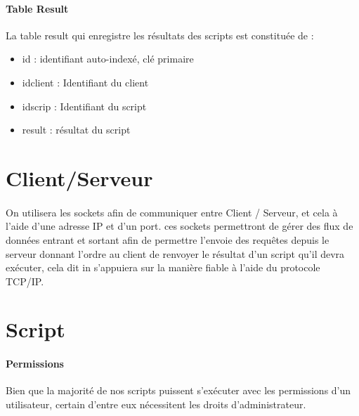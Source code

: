 \documentclass[11pt,a4paper,titlepage, oneside]{article}
\begin{document}
		\paragraph{Table Result}
			La table result qui enregistre les résultats des scripts est constituée de :
			\begin{itemize}
				\item id : identifiant auto-indexé, clé primaire
				\item idclient : Identifiant du client
				\item idscrip : Identifiant du script
				\item result : résultat du script
			\end{itemize}
		
		
\newpage
\section{{\color{red} Client/Serveur}}
\paragraph{}
On utilisera les sockets afin de communiquer entre Client / Serveur, et cela à l'aide d'une adresse IP et d'un port. ces sockets permettront de gérer des flux de données entrant et sortant afin de permettre l'envoie des requêtes depuis le serveur donnant l'ordre au client de renvoyer le résultat d'un script qu'il devra exécuter, cela dit in s'appuiera sur la manière fiable à l'aide du protocole TCP/IP. 



\newpage
\section{{\color{red} Script }}
	\paragraph{Permissions}
		Bien que la majorité de nos scripts puissent s'exécuter avec les permissions d'un utilisateur, certain d'entre eux nécessitent les droits d'administrateur.\\
\end{document}
